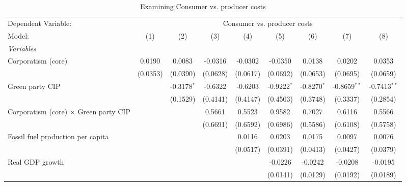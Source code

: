 
\begin{table}[htbp]
   \caption{Examining Consumer vs. producer costs}
   \centering
   \begin{tabular}{lcccccccc}
      \tabularnewline \midrule \midrule
      Dependent Variable: & \multicolumn{8}{c}{Consumer vs. producer costs}\\
      Model:                                       & (1)      & (2)           & (3)      & (4)      & (5)           & (6)           & (7)            & (8)\\  
      \midrule
      \emph{Variables}\\
      Corporatism (core)                           & 0.0190   & 0.0083        & -0.0316  & -0.0302  & -0.0350       & 0.0138        & 0.0202         & 0.0353\\   
                                                   & (0.0353) & (0.0390)      & (0.0628) & (0.0617) & (0.0692)      & (0.0653)      & (0.0695)       & (0.0659)\\   
      Green party CIP                              &          & -0.3178$^{*}$ & -0.6322  & -0.6203  & -0.9222$^{*}$ & -0.8270$^{*}$ & -0.8659$^{**}$ & -0.7413$^{**}$\\   
                                                   &          & (0.1529)      & (0.4141) & (0.4147) & (0.4503)      & (0.3748)      & (0.3337)       & (0.2854)\\   
      Corporatism (core) $\times$ Green party CIP  &          &               & 0.5661   & 0.5523   & 0.9582        & 0.7027        & 0.6116         & 0.5566\\   
                                                   &          &               & (0.6691) & (0.6592) & (0.6986)      & (0.5586)      & (0.6108)       & (0.5758)\\   
      Fossil fuel production per capita            &          &               &          & 0.0116   & 0.0203        & 0.0175        & 0.0097         & 0.0076\\   
                                                   &          &               &          & (0.0517) & (0.0391)      & (0.0413)      & (0.0427)       & (0.0379)\\   
      Real GDP growth                              &          &               &          &          & -0.0226       & -0.0242       & -0.0208        & -0.0195\\   
                                                   &          &               &          &          & (0.0141)      & (0.0129)      & (0.0192)       & (0.0189)\\   

\end{tabular}
\end{table}
